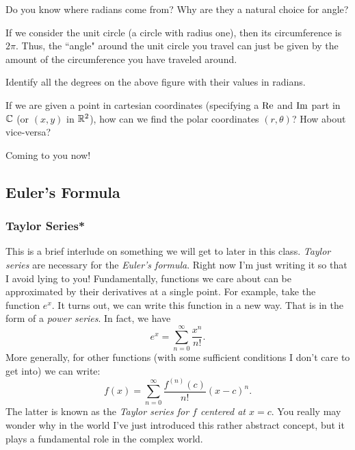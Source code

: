 \begin{question}
        Do you know where radians come from? Why are they a natural choice for angle?
\end{question}

\begin{answer}
    If we consider the unit circle (a circle with radius one), then its circumference is $2\pi$. Thus, the ``angle" around the unit circle you travel can just be given by the amount of the circumference you have traveled around.
\end{answer}

\begin{exercise}
Identify all the degrees on the above figure with their values in radians.
\end{exercise}

\begin{question}
        If we are given a point in cartesian coordinates (specifying a $\mathrm{Re}$ and $\mathrm{Im}$ part in $\mathbb{C}$ (or $(x,y)$ in $\mathbb{R}^2$), how can we find the polar coordinates $(r, \theta)$? How about vice-versa?
\end{question}

        \begin{answer}
            Coming to you now!
        \end{answer}

        \subsection{Euler's Formula}

        \subsubsection{Taylor Series*}
        This is a brief interlude on something we will get to later in this class.  \emph{Taylor series} are necessary for the \emph{Euler's formula}. Right now I'm just writing it so that I avoid lying to you! Fundamentally, functions we care about can be approximated by their derivatives at a single point. For example, take the function $e^x$.  It turns out, we can write this function in a new way.  That is in the form of a \emph{power series}. In fact, we have
        \[
        e^x = \sum_{n=0}^\infty \frac{x^n}{n!}.
        \]
        More generally, for other functions (with some sufficient conditions I don't care to get into) we can write:
        \[
        f(x)=\sum_{n=0}^\infty \frac{f^{(n)}(c)}{n!}(x-c)^n.
        \]
        The latter is known as the \emph{Taylor series for $f$ centered at $x=c$}. You really may wonder why in the world I've just introduced this rather abstract concept, but it plays a fundamental role in the complex world.

